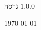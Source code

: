
\begin{center}
\begin{bfseries}
\bigskip
\bigskip
גרסה
$1.0.0$

\bigskip

\today

\end{bfseries}
\end{center}
